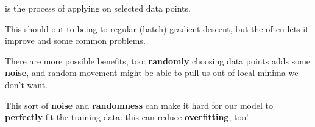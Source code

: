         \begin{definition}
             is the process of applying  on  selected data points.
            
            This should  out to being  to regular (batch) gradient descent, but the  often lets it improve  and  some common problems.
        \end{definition}
            
        
        There are more possible benefits, too: \textbf{randomly} choosing data points adds some \textbf{noise}, and random movement might be able to pull us out of local minima we don't want.
            
        This sort of \textbf{noise} and \textbf{randomness} can make it hard for our model to \textbf{perfectly} fit the training data: this can reduce \textbf{overfitting}, too!
            
